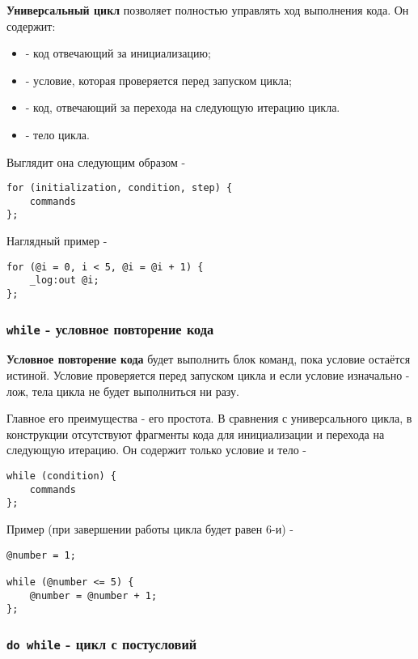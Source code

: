\documentclass[a4paper, 14pt]{extarticle}
\newenvironment{icItems}
	{ \begin{itemize} [noitemsep,nolistsep] }
	{ \end{itemize} }
\begin{document}
{\bf Универсальный цикл} позволяет полностью управлять ход выполнения кода. Он содержит:

\begin{icItems}
\item
	 - код отвечающий за инициализацию;
\item
	 - условие, которая проверяется перед запуском цикла;
\item
	 - код, отвечающий за перехода на следующую итерацию цикла.
\item
	 - тело цикла.
\end{icItems}

\noindent Выглядит она следующим образом -
\begin{lstlisting}[numbers=none]
for (initialization, condition, step) {
	commands
};
\end{lstlisting}

\noindent Наглядный пример -
\begin{lstlisting}
for (@i = 0, i < 5, @i = @i + 1) {
	_log:out @i;
};
\end{lstlisting}

\subsubsection{\lstinline`while` - условное повторение кода}

{\bf Условное повторение кода} будет выполнить блок команд, пока условие остаётся истиной. Условие проверяется перед запуском цикла и если условие изначально - лож, тела цикла не будет выполниться ни разу.

Главное его преимущества - его простота. В сравнения с универсального цикла, в конструкции  отсутствуют фрагменты кода для инициализации и перехода на следующую итерацию. Он содержит только условие и тело -
\begin{lstlisting}[numbers=none]
while (condition) {
	commands
};
\end{lstlisting}

\noindent Пример (при завершении работы цикла  будет равен 6-и) -
\begin{lstlisting}[numbers=none]
@number = 1;

while (@number <= 5) {
	@number = @number + 1;
};
\end{lstlisting}

\subsubsection{\lstinline`do while` - цикл с постусловий}
\end{document}
